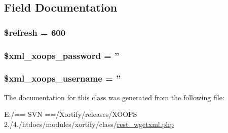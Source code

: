 \subsection{Field Documentation}
\hypertarget{class_r_e_s_t___w_g_e_t_x_m_l_xortify_exchange_a8527f826b6959aaa92b0e51ee427ba1a}{
\subsubsection[{\$refresh}]{\setlength{\rightskip}{0pt plus 5cm}\$refresh = 600}}\label{class_r_e_s_t___w_g_e_t_x_m_l_xortify_exchange_a8527f826b6959aaa92b0e51ee427ba1a}
\hypertarget{class_r_e_s_t___w_g_e_t_x_m_l_xortify_exchange_a8ec2889165c837354fded1cedbd42157}{
\subsubsection[{\$xml\-\_\-xoops\-\_\-password}]{\setlength{\rightskip}{0pt plus 5cm}\$xml\-\_\-xoops\-\_\-password = ''}}\label{class_r_e_s_t___w_g_e_t_x_m_l_xortify_exchange_a8ec2889165c837354fded1cedbd42157}
\hypertarget{class_r_e_s_t___w_g_e_t_x_m_l_xortify_exchange_a725df0dd6b578e15522ed15945e5901c}{
\subsubsection[{\$xml\-\_\-xoops\-\_\-username}]{\setlength{\rightskip}{0pt plus 5cm}\$xml\-\_\-xoops\-\_\-username = ''}}\label{class_r_e_s_t___w_g_e_t_x_m_l_xortify_exchange_a725df0dd6b578e15522ed15945e5901c}


The documentation for this class was generated from the following file\-:\begin{DoxyCompactItemize}
\item 
E\-:/== S\-V\-N ==/\-Xortify/releases/\-X\-O\-O\-P\-S 2./4./htdocs/modules/xortify/class/\hyperlink{rest__wgetxml_8php}{rest\-\_\-wgetxml.\-php}\end{DoxyCompactItemize}

